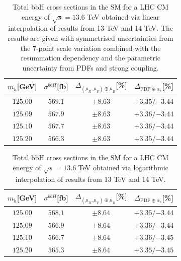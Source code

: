 \documentclass[11pt,a4paper]{article}
\begin{document}
\begin{table}[ht!]
\begin{center}%
\begin{small}%
\begin{tabular}{cccc}%
$m_h$[GeV] & $\sigma^{bbH}$[fb] & $\Delta_{\left(\mu_{R},\mu_{F}\right)\oplus\mu_{B}}$[\%] & $\Delta_{\mathrm{PDF}\oplus\alpha_s}$[\%]  \\\hline
$125.00$ & $569.1$ & $\pm8.63$ & ${{+3.35}}/{-3.44}$ \\
$125.09$ & $567.9$ & $\pm8.63$ & ${{+3.36}}/{-3.44}$ \\
$125.10$ & $567.7$ & $\pm8.63$ & ${{+3.36}}/{-3.44}$ \\
$125.20$ & $566.3$ & $\pm8.63$ & ${{+3.35}}/{-3.44}$ 
\end{tabular}%
\end{small}%
\end{center}%
\caption{Total bbH{} cross sections in the SM for a LHC CM energy of $\sqrt{s}=13.6$ TeV obtained via linear interpolation of results from 13 TeV and 14 TeV. The results are given with symmetrised uncertainties from the 7-point scale variation combined with the resummation dependency and the parametric uncertainty from PDFs and strong coupling.}
\label{tab:bbH136lin}
\end{table}

\begin{table}[ht!]
\begin{center}%
\begin{small}%
\begin{tabular}{cccc}%
$m_h$[GeV] & $\sigma^{bbH}$[fb] & $\Delta_{\left(\mu_{R},\mu_{F}\right)\oplus\mu_{B}}$[\%] & $\Delta_{\mathrm{PDF}\oplus\alpha_s}$[\%]  \\\hline
$125.00$ & $568.1$ & $\pm8.64$ & ${{+3.35}}/{-3.44}$ \\
$125.09$ & $566.9$ & $\pm8.64$ & ${{+3.36}}/{-3.44}$ \\
$125.10$ & $566.7$ & $\pm8.64$ & ${{+3.36}}/{-3.45}$ \\
$125.20$ & $565.3$ & $\pm8.64$ & ${{+3.35}}/{-3.45}$ 
\end{tabular}%
\end{small}%
\end{center}%
\caption{Total bbH{} cross sections in the SM for a LHC CM energy of $\sqrt{s}=13.6$ TeV obtained via logarithmic interpolation of results from 13 TeV and 14 TeV.}
\label{tab:bbH136log}
\end{table}
\end{document}
